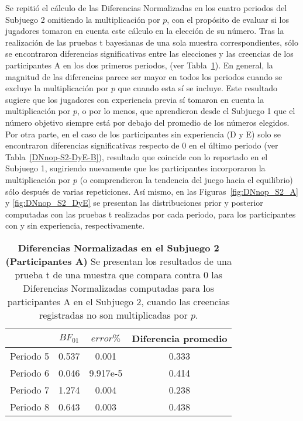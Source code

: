 Se repitió el cálculo de las Diferencias Normalizadas en los cuatro periodos del Subjuego 2 omitiendo la multiplicación por $p$, con el propósito de evaluar si los jugadores tomaron en cuenta este cálculo en la elección de su número. Tras la realización de las pruebas t bayesianas de una sola muestra correspondientes,  sólo se encontraron diferencias significativas entre las elecciones y las creencias de los participantes A en los dos primeros  periodos, (ver Tabla~\ref{DNnop-S2-A-B}). En general, la magnitud de las diferencias parece ser mayor en todos los periodos cuando se excluye la multiplicación por $p$ que cuando esta sí se incluye. Este resultado sugiere que los jugadores con experiencia previa sí tomaron en cuenta la multiplicación por $p$, o por lo menos, que aprendieron desde el Subjuego 1 que el número objetivo siempre está por debajo del promedio de los números elegidos.\\

Por otra parte, en el caso de los participantes sin experiencia (D y E) solo se encontraron diferencias significativas respecto de 0 en el último periodo (ver Tabla~\ref{DNnop-S2-DyE-B}), resultado que coincide con lo reportado en el Subjuego 1, sugiriendo nuevamente que los participantes incorporaron la multiplicación por $p$ (o comprendieron la tendencia del juego hacia el equilibrio)  sólo después de varias repeticiones. Así mismo, en las Figuras~\ref{fig:DNnop_S2_A} y \ref{fig:DNnop_S2_DyE} se presentan las distribuciones prior y posterior computadas con las pruebas t realizadas por cada periodo, para los participantes con y sin experiencia, respectivamente.\\

\begin{table}[h]
\caption[Diferencias Normalizadas en el Subjuego 2 omitiendo la multiplicación por $p$; Participante A (Pruebas t de una muestra)]{\textbf{Diferencias Normalizadas en el Subjuego 2 (Participantes A)} Se presentan los resultados de una prueba t de una muestra que compara contra 0 las Diferencias Normalizadas computadas para los participantes A en el Subjuego 2, cuando las creencias registradas no son multiplicadas por $p$.}
\label{DNnop-S2-A-B}
\centering
\begin{tabular}{l | c c | c}
\toprule
\textbf{} & \textbf{$BF_{01}$} & \textbf{$error\%$} & \textbf{Diferencia promedio}\\
\midrule
Periodo 5 & 0.537 & 0.001 & 0.333\\
Periodo 6 & 0.046 & 9.917e-5 & 0.414\\
Periodo 7 & 1.274 & 0.004 & 0.238\\
Periodo 8 & 0.643 & 0.003 & 0.438\\
\bottomrule
\end{tabular}
\end{table}


